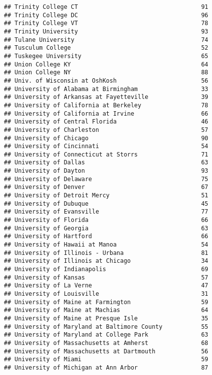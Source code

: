 \documentclass[
]{article}
\begin{document}
\begin{verbatim}
## Trinity College CT                                   91
## Trinity College DC                                   96
## Trinity College VT                                   78
## Trinity University                                   93
## Tulane University                                    74
## Tusculum College                                     52
## Tuskegee University                                  65
## Union College KY                                     64
## Union College NY                                     88
## Univ. of Wisconsin at OshKosh                        56
## University of Alabama at Birmingham                  33
## University of Arkansas at Fayetteville               39
## University of California at Berkeley                 78
## University of California at Irvine                   66
## University of Central Florida                        46
## University of Charleston                             57
## University of Chicago                                90
## University of Cincinnati                             54
## University of Connecticut at Storrs                  71
## University of Dallas                                 63
## University of Dayton                                 93
## University of Delaware                               75
## University of Denver                                 67
## University of Detroit Mercy                          51
## University of Dubuque                                45
## University of Evansville                             77
## University of Florida                                66
## University of Georgia                                63
## University of Hartford                               66
## University of Hawaii at Manoa                        54
## University of Illinois - Urbana                      81
## University of Illinois at Chicago                    34
## University of Indianapolis                           69
## University of Kansas                                 57
## University of La Verne                               47
## University of Louisville                             31
## University of Maine at Farmington                    59
## University of Maine at Machias                       64
## University of Maine at Presque Isle                  35
## University of Maryland at Baltimore County           55
## University of Maryland at College Park               63
## University of Massachusetts at Amherst               68
## University of Massachusetts at Dartmouth             56
## University of Miami                                  59
## University of Michigan at Ann Arbor                  87

\end{verbatim}
\end{document}
